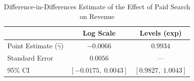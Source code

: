 \begin{table}[h]
    \centering
    \caption{Difference-in-Differences Estimate of the Effect of Paid Search on Revenue}
    \begin{tabular}{lcc}
    \hline
    & Log Scale & Levels (exp) \\
    \hline
    Point Estimate ($\hat{\gamma}$) & $-0.0066$ & $0.9934$ \\
    Standard Error & $0.0056$ & --- \\
    95\% CI & $[-0.0175, \; 0.0043]$ & $[0.9827, \; 1.0043]$ \\
    \hline
    \end{tabular}
    \label{tab:did}
    \end{table}